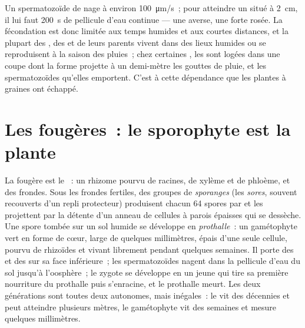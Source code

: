 \begin{example}\label{ex:b2:plant-life-cycles:sperm}
Un spermatozoïde de  nage à environ \qty{100}{\micro m/s}~; pour
atteindre un  situé à \qty{2}{cm}, il lui faut \qty{200}{s}
de pellicule d'eau continue --- une averse, une forte rosée. La
fécondation est donc limitée aux temps humides et aux courtes distances,
et la plupart des , des  et de leurs parents vivent dans
des lieux humides ou se reproduisent à la saison des pluies~; chez
certaines , les  sont logées dans une coupe dont la
forme projette à un demi-mètre les gouttes de pluie, et les
spermatozoïdes qu'elles emportent. C'est à cette dépendance que les
plantes à graines ont échappé.
\end{example}

\section{Les fougères~: le sporophyte est la plante}

\begin{definition}\label{def:b2:plant-life-cycles:fern}
La fougère est le \emph{}~: un rhizome pourvu de racines, de
xylème et de phloème, et des frondes. Sous les frondes fertiles, des
groupes de \emph{sporanges} (les \emph{sores}, souvent recouverts d'un
repli protecteur) produisent chacun 64 spores par  et les
projettent par la détente d'un anneau de cellules à parois épaisses qui
se dessèche. Une spore tombée sur un sol humide se développe en
\emph{prothalle}~: un gamétophyte vert en forme de cœur, large de
quelques millimètres, épais d'une seule cellule, pourvu de rhizoïdes et
vivant librement pendant quelques semaines. Il porte des  et
des  sur sa face inférieure~; les spermatozoïdes nagent dans
la pellicule d'eau du sol jusqu'à l'oosphère~; le zygote se développe
en un jeune  qui tire sa première nourriture du prothalle
puis s'enracine, et le prothalle meurt. Les deux générations sont
toutes deux autonomes, mais inégales~: le  vit des décennies
et peut atteindre plusieurs mètres, le gamétophyte vit des semaines et
mesure quelques millimètres.
\end{definition}

